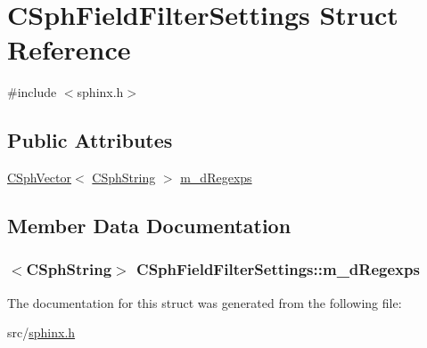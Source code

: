 \hypertarget{structCSphFieldFilterSettings}{\section{C\-Sph\-Field\-Filter\-Settings Struct Reference}
\label{structCSphFieldFilterSettings}
}


{\ttfamily \#include $<$sphinx.\-h$>$}

\subsection*{Public Attributes}
\begin{DoxyCompactItemize}
\item 
\hyperlink{classCSphVector}{C\-Sph\-Vector}$<$ \hyperlink{structCSphString}{C\-Sph\-String} $>$ \hyperlink{structCSphFieldFilterSettings_a4293bbcc7d17e6774146c117c6589b11}{m\-\_\-d\-Regexps}
\end{DoxyCompactItemize}


\subsection{Member Data Documentation}
\hypertarget{structCSphFieldFilterSettings_a4293bbcc7d17e6774146c117c6589b11}{
\subsubsection[{m\-\_\-d\-Regexps}]{$<${\bf C\-Sph\-String}$>$ C\-Sph\-Field\-Filter\-Settings\-::m\-\_\-d\-Regexps}}\label{structCSphFieldFilterSettings_a4293bbcc7d17e6774146c117c6589b11}


The documentation for this struct was generated from the following file\-:\begin{DoxyCompactItemize}
\item 
src/\hyperlink{sphinx_8h}{sphinx.\-h}\end{DoxyCompactItemize}

